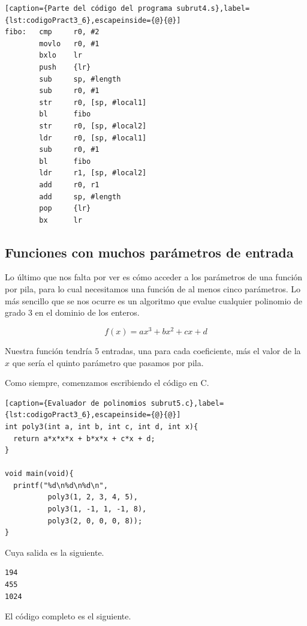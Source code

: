 \begin{lstlisting}[caption={Parte del código del programa subrut4.s},label={lst:codigoPract3_6},escapeinside={@}{@}]
fibo:   cmp     r0, #2
        movlo   r0, #1
        bxlo    lr
        push    {lr}
        sub     sp, #length
        sub     r0, #1
        str     r0, [sp, #local1]
        bl      fibo
        str     r0, [sp, #local2]
        ldr     r0, [sp, #local1]
        sub     r0, #1
        bl      fibo
        ldr     r1, [sp, #local2]
        add     r0, r1
        add     sp, #length
        pop     {lr}
        bx      lr
\end{lstlisting}

\subsection{Funciones con muchos parámetros de entrada}

Lo último que nos falta por ver es cómo acceder a los parámetros de una función por pila, para
lo cual necesitamos una función de al menos cinco parámetros. Lo más sencillo que se nos ocurre
es un algoritmo que evalue cualquier polinomio de grado 3 en el dominio de los enteros.


\begin{equation}
f(x) = ax^3 + bx^2 + cx + d
\label{eq:polinomio}
\end{equation}


Nuestra función tendría 5 entradas, una para cada coeficiente, más el valor de la $x$ que
sería el quinto parámetro que pasamos por pila.

Como siempre, comenzamos escribiendo el código en C.

\begin{lstlisting}[caption={Evaluador de polinomios subrut5.c},label={lst:codigoPract3_6},escapeinside={@}{@}]
int poly3(int a, int b, int c, int d, int x){
  return a*x*x*x + b*x*x + c*x + d;
}

void main(void){
  printf("%d\n%d\n%d\n",
          poly3(1, 2, 3, 4, 5), 
          poly3(1, -1, 1, -1, 8), 
          poly3(2, 0, 0, 0, 8));
}
\end{lstlisting}

Cuya salida es la siguiente.

\begin{lstlisting}
194
455
1024
\end{lstlisting}

El código completo es el siguiente.

